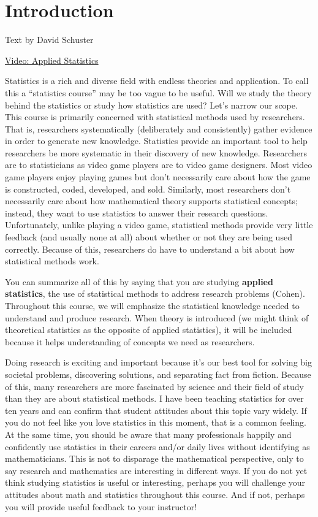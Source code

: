 \documentclass[
]{book}
\begin{document}
\hypertarget{introduction}{%
\section{Introduction}\label{introduction}}

Text by David Schuster

\href{https://youtu.be/AFpygj7cnD8}{Video: Applied Statistics}

Statistics is a rich and diverse field with endless theories and application. To call this a ``statistics course'' may be too vague to be useful. Will we study the theory behind the statistics or study how statistics are used? Let's narrow our scope. This course is primarily concerned with statistical methods used by researchers. That is, researchers systematically (deliberately and consistently) gather evidence in order to generate new knowledge. Statistics provide an important tool to help researchers be more systematic in their discovery of new knowledge. Researchers are to statisticians as video game players are to video game designers. Most video game players enjoy playing games but don't necessarily care about how the game is constructed, coded, developed, and sold. Similarly, most researchers don't necessarily care about how mathematical theory supports statistical concepts; instead, they want to use statistics to answer their research questions. Unfortunately, unlike playing a video game, statistical methods provide very little feedback (and usually none at all) about whether or not they are being used correctly. Because of this, researchers do have to understand a bit about how statistical methods work.

You can summarize all of this by saying that you are studying \textbf{applied statistics}, the use of statistical methods to address research problems (Cohen). Throughout this course, we will emphasize the statistical knowledge needed to understand and produce research. When theory is introduced (we might think of theoretical statistics as the opposite of applied statistics), it will be included because it helps understanding of concepts we need as researchers.

Doing research is exciting and important because it's our best tool for solving big societal problems, discovering solutions, and separating fact from fiction. Because of this, many researchers are more fascinated by science and their field of study than they are about statistical methods. I have been teaching statistics for over ten years and can confirm that student attitudes about this topic vary widely. If you do not feel like you love statistics in this moment, that is a common feeling. At the same time, you should be aware that many professionals happily and confidently use statistics in their careers and/or daily lives without identifying as mathematicians. This is not to disparage the mathematical perspective, only to say research and mathematics are interesting in different ways. If you do not yet think studying statistics is useful or interesting, perhaps you will challenge your attitudes about math and statistics throughout this course. And if not, perhaps you will provide useful feedback to your instructor!
\end{document}
